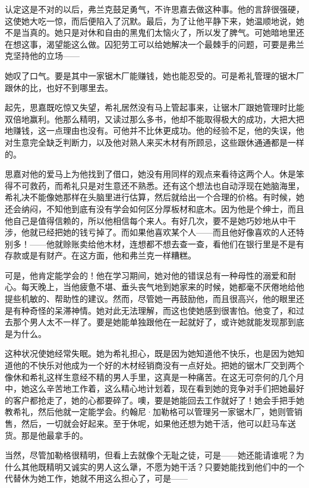 \par 认定这是不对的以后，弗兰克鼓足勇气，不许思嘉去做这种事。他的言辞很强硬，这使她大吃一惊，而后便陷入了沉默。最后，为了让他平静下来，她温顺地说，她不是当真的。她只是对休和自由的黑鬼们太恼火了，所以发了脾气。可她暗地里还在想这事，渴望能这么做。囚犯劳工可以给她解决一个最棘手的问题，可要是弗兰克坚持他的立场——
\par 她叹了口气。要是其中一家锯木厂能赚钱，她也能忍受的。可是希礼管理的锯木厂跟休的比，也好不到哪里去。
\par 起先，思嘉既吃惊又失望，希礼居然没有马上管起事来，让锯木厂跟她管理时比能双倍地赢利。他那么精明，又读过那么多书，他却不能取得极大的成功，大把大把地赚钱，这一点理由也没有。可他并不比休更成功。他的经验不足，他的失误，他对生意完全缺乏判断力，以及他对熟人来买木材有所顾忌，这些跟休通通都是一样的。
\par 思嘉对他的爱马上为他找到了借口，她没有用同样的观点来看待这两个人。休是笨得不可救药，而希礼只是对生意还不熟悉。还有这个想法也自动浮现在她脑海里，希礼决不能像她那样在头脑里进行估算，然后就给出一个合理的价格。有时候，她还会纳闷，不知他到底有没有学会如何区分厚板材和底木。因为他是个绅士，而且他自己是值得信赖的，所以他相信每个来人。有好几次，要不是她巧妙地从中干涉，他就已经把她的钱亏掉了。而如果他喜欢某个人——而且他好像喜欢的人还特别多！——他就赊账卖给他木材，连想都不想去查一查，看他们在银行里是不是有存款或是有财产。在这方面，他和弗兰克一样糟糕。
\par 可是，他肯定能学会的！他在学习期间，她对他的错误总有一种母性的溺爱和耐心。每天晚上，当他疲惫不堪、垂头丧气地到她家来的时候，她都毫不厌倦地给他提些机敏的、帮助性的建议。然而，尽管她一再鼓励他，而且很高兴，他的眼里还是有种奇怪的呆滞神情。她对此无法理解，而这也使她感到很害怕。他变了，和过去那个男人太不一样了。要是她能单独跟他在一起就好了，或许她就能发现那到底是为什么。
\par 这种状况使她经常失眠。她为希礼担心，既是因为她知道他不快乐，也是因为她知道他的不快乐对他成为一个好的木材经销商没有一点好处。把她的锯木厂交到两个像休和希礼这样生意经不精的男人手里，这真是一种痛苦。在这无可奈何的几个月中，她这么辛苦地工作着，这么精心地计划着，现在看到她的竞争对手们把她最好的客户都抢走了，她的心都要碎了。噢，要是她能回去工作就好了！她会手把手她教希礼，然后他就一定能学会。约翰尼·加勒格可以管理另一家锯木厂，她则管销售，然后，一切就会好起来。至于休呢，如果他还想为她干活，他可以赶马车送货。那是他最拿手的。
\par 当然，尽管加勒格很精明，但看上去就像个无耻之徒，可是——她还能请谁呢？为什么其他既精明又诚实的男人这么犟，不愿为她干活？只要她能找到他们中的一个代替休为她工作，她就不用这么担心了，可是——
